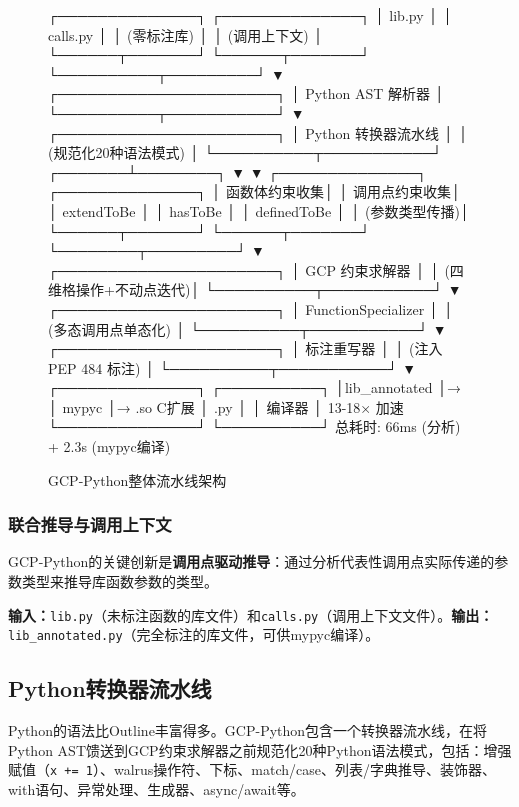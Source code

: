 \documentclass[UTF8]{article}
\begin{document}
\begin{figure}[h]
\centering
\begin{asciiart}
┌──────────────┐    ┌──────────────┐
│   lib.py     │    │  calls.py    │
│ (零标注库)   │    │ (调用上下文) │
└──────┬───────┘    └──────┬───────┘
       └──────────┬─────────┘
                  ▼
       ┌──────────────────────┐
       │   Python AST 解析器   │
       └──────────┬───────────┘
                  ▼
       ┌──────────────────────┐
       │  Python 转换器流水线  │
       │  (规范化20种语法模式) │
       └──────────┬───────────┘
          ┌───────┴────────┐
          ▼                ▼
  ┌──────────────┐  ┌──────────────┐
  │ 函数体约束收集│  │ 调用点约束收集│
  │ extendToBe   │  │ hasToBe      │
  │ definedToBe  │  │ (参数类型传播)│
  └──────┬───────┘  └──────┬───────┘
         └────────┬─────────┘
                  ▼
       ┌──────────────────────┐
       │    GCP 约束求解器     │
       │ (四维格操作+不动点迭代)│
       └──────────┬───────────┘
                  ▼
       ┌──────────────────────┐
       │  FunctionSpecializer │
       │  (多态调用点单态化)   │
       └──────────┬───────────┘
                  ▼
       ┌──────────────────────┐
       │     标注重写器        │
       │ (注入 PEP 484 标注)   │
       └──────────┬───────────┘
                  ▼
  ┌──────────────┐  ┌──────────┐
  │lib_annotated │→ │  mypyc   │→ .so C扩展
  │    .py       │  │  编译器  │  13-18× 加速
  └──────────────┘  └──────────┘
  总耗时: 66ms (分析) + 2.3s (mypyc编译)
\end{asciiart}
\caption{GCP-Python整体流水线架构}
\label{fig:pipeline}
\end{figure}

\subsubsection{联合推导与调用上下文}

GCP-Python的关键创新是\textbf{调用点驱动推导}：通过分析代表性调用点实际传递的参数类型来推导库函数参数的类型。

\textbf{输入：}\texttt{lib.py}（未标注函数的库文件）和\texttt{calls.py}（调用上下文文件）。\textbf{输出：}\texttt{lib\_annotated.py}（完全标注的库文件，可供mypyc编译）。

\subsection{Python转换器流水线}

Python的语法比Outline丰富得多。GCP-Python包含一个转换器流水线，在将Python AST馈送到GCP约束求解器之前规范化20种Python语法模式，包括：增强赋值（\texttt{x += 1}）、walrus操作符、下标、match/case、列表/字典推导、装饰器、with语句、异常处理、生成器、async/await等。
\end{document}
